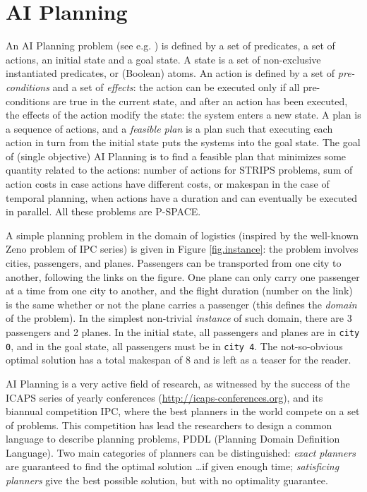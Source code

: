 \documentclass{llncs}
\def\ZENO{{\sc Zeno}}
\begin{document}
\section{AI Planning}
\label{AIPlanning}

An AI Planning problem (see e.g. \cite{AIplanningBook2004}) is defined by a set of predicates, a set of actions, an initial state and a goal state. A state is a set of non-exclusive instantiated predicates, or (Boolean) atoms. An action is defined by a set of {\em pre-conditions} and a set of {\em effects}: the action can be executed only if all pre-conditions are true in the current state, and after an action has been executed, the effects of the action modify the state: the system enters a new state.
A plan is a sequence of actions, and a {\em feasible plan} is a plan such that executing each action in turn from the initial state puts the systems into the goal state. 
The goal of (single objective) AI Planning is to find a feasible plan that minimizes some quantity related to the actions: number of actions for STRIPS problems, sum of action costs in case actions have different costs, or makespan in the case of temporal planning, when actions have a duration and can eventually be executed in parallel. All these problems are P-SPACE.

A simple planning problem in the domain of logistics (inspired by the well-known {\ZENO} problem of IPC series) is given in Figure \ref{fig.instance}: the problem involves cities, passengers, and planes. Passengers can be transported from one city to another, following the links on the figure. One plane can only carry one passenger at a time from one city to another, and the flight duration (number on the link) is the same whether or not the plane carries a passenger (this defines the {\em domain} of the problem). In the simplest non-trivial {\em instance} of such domain, there are 3 passengers and 2 planes. In the initial state, all passengers and planes are in {\tt city 0}, and in the goal state, all passengers must be in {\tt city 4}. The not-so-obvious optimal solution has a total makespan of 8 and is left as a teaser for the reader.

AI Planning is a very active field of research, as witnessed by the success of the ICAPS series of yearly conferences (\url{http://icaps-conferences.org}), and its biannual competition IPC, where the best planners in the world compete on a set of problems. This competition has lead the researchers to design a common language to describe planning problems, PDDL (Planning Domain Definition Language). Two main categories of planners can be distinguished: {\em exact planners} are guaranteed to find the optimal solution \ldots if given enough time; {\em satisficing planners} give the best possible solution, but with no optimality guarantee.  %
\end{document}
